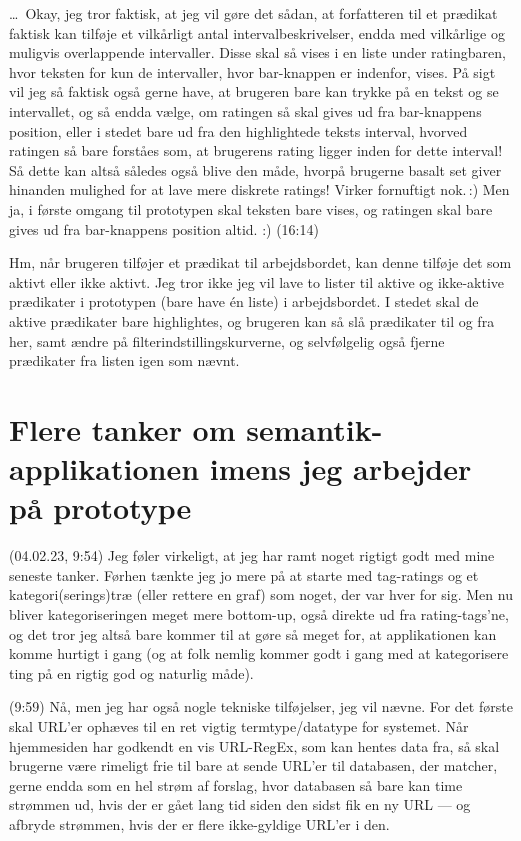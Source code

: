 \documentclass{report}
\begin{document}
\ldots\ Okay, jeg tror faktisk, at jeg vil gøre det sådan, at forfatteren til et prædikat faktisk kan tilføje et vilkårligt antal intervalbeskrivelser, endda med vilkårlige og muligvis overlappende intervaller. Disse skal så vises i en liste under ratingbaren, hvor teksten for kun de intervaller, hvor bar-knappen er indenfor, vises. På sigt vil jeg så faktisk også gerne have, at brugeren bare kan trykke på en tekst og se intervallet, og så endda vælge, om ratingen så skal gives ud fra bar-knappens position, eller i stedet bare ud fra den highlightede teksts interval, hvorved ratingen så bare forståes som, at brugerens rating ligger inden for dette interval! Så dette kan altså således også blive den måde, hvorpå brugerne basalt set giver hinanden mulighed for at lave mere diskrete ratings! Virker fornuftigt nok.\,:) Men ja, i første omgang til prototypen skal teksten bare vises, og ratingen skal bare gives ud fra bar-knappens position altid. :) (16:14)

Hm, når brugeren tilføjer et prædikat til arbejdsbordet, kan denne tilføje det som aktivt eller ikke aktivt. Jeg tror ikke jeg vil lave to lister til aktive og ikke-aktive prædikater i prototypen (bare have én liste) i arbejdsbordet. I stedet skal de aktive prædikater bare highlightes, og brugeren kan så slå prædikater til og fra her, samt ændre på filterindstillingskurverne, og selvfølgelig også fjerne prædikater fra listen igen som nævnt. 






\section{Flere tanker om semantik-applikationen imens jeg arbejder på prototype}

(04.02.23, 9:54) Jeg føler virkeligt, at jeg har ramt noget rigtigt godt med mine seneste tanker. Førhen tænkte jeg jo mere på at starte med tag-ratings og et kategori(serings)træ (eller rettere en graf) som noget, der var hver for sig. Men nu bliver kategoriseringen meget mere bottom-up, også direkte ud fra rating-tags'ne, og det tror jeg altså bare kommer til at gøre så meget for, at applikationen kan komme hurtigt i gang (og at folk nemlig kommer godt i gang med at kategorisere ting på en rigtig god og naturlig måde). 

(9:59) Nå, men jeg har også nogle tekniske tilføjelser, jeg vil nævne. For det første skal URL'er ophæves til en ret vigtig termtype/datatype for systemet. Når hjemmesiden har godkendt en vis URL-RegEx, som kan hentes data fra, så skal brugerne være rimeligt frie til bare at sende URL'er til databasen, der matcher, gerne endda som en hel strøm af forslag, hvor databasen så bare kan time strømmen ud, hvis der er gået lang tid siden den sidst fik en ny URL --- og afbryde strømmen, hvis der er flere ikke-gyldige URL'er i den. 
\end{document}
